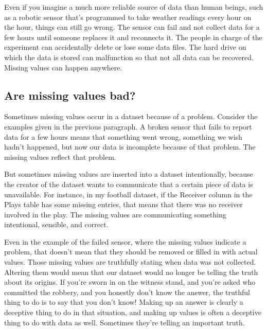 \documentclass[letterpaper,10pt,english]{jupyterBook}
\begin{document}
\sphinxAtStartPar
Even if you imagine a much more reliable source of data than human beings, such as a robotic sensor that’s programmed to take weather readings every hour on the hour, things can still go wrong.  The sensor can fail and not collect data for a few hours until someone replaces it and reconnects it.  The people in charge of the experiment can accidentally delete or lose some data files.  The hard drive on which the data is stored can malfunction so that not all data can be recovered.  Missing values can happen anywhere.


\subsection{Are missing values bad?}
\label{\detokenize{chapter-13-etl:are-missing-values-bad}}
\sphinxAtStartPar
Sometimes missing values occur in a dataset because of a problem.  Consider the examples given in the previous paragraph.  A broken sensor that fails to report data for a few hours means that something went wrong, something we wish hadn’t happened, but now our data is incomplete because of that problem.  The missing values reflect that problem.

\sphinxAtStartPar
But sometimes missing values are inserted into a dataset intentionally, because the creator of the dataset wants to communicate that a certain piece of data is unavailable.  For instance, in my football dataset, if the Receiver column in the Plays table has some missing entries, that means that there was no receiver involved in the play.  The missing values are communicating something intentional, sensible, and correct.  

\sphinxAtStartPar
Even in the example of the failed sensor, where the missing values indicate a problem, that doesn’t mean that they should be removed or filled in with actual values.  Those missing values are truthfully stating when data was not collected.  Altering them would mean that our dataset would no longer be telling the truth about its origins.  If you’re sworn in on the witness stand, and you’re asked who committed the robbery, and you honestly don’t know the answer, the truthful thing to do is to say that you don’t know!  Making up an answer is clearly a deceptive thing to do in that situation, and making up values is often a deceptive thing to do with data as well.    Sometimes they’re telling an important truth.
\end{document}
